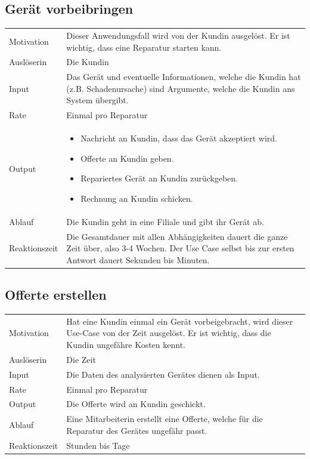 \documentclass[a4paper]{scrartcl}
\begin{document}
\subsection{Gerät vorbeibringen}
\begin{tabularx}{\textwidth}{l|X}
  
  Motivation & Dieser Anwendungsfall wird von
  der Kundin ausgelöst. Er ist wichtig, dass eine
  Reparatur starten kann. \\ 
  Auslöserin & Die Kundin \\ 
  Input & Das Gerät und eventuelle Informationen, welche
  die Kundin hat (z.B. Schadenursache) sind Argumente, welche
  die Kundin ans System übergibt. \\ 
  Rate & Einmal pro Reparatur \\ 
  Output &
  \begin{minipage}[t]{\linewidth}
  \begin{itemize}[nosep,after=\strut]
    \item Nachricht an Kundin, dass das Gerät akzeptiert wird.
    \item Offerte an Kundin geben.
    \item Repariertes Gerät an Kundin zurückgeben.
    \item Rechnung an Kundin schicken.
  \end{itemize}
  \end{minipage} \\
  Ablauf & Die Kundin geht in eine Filiale und
  gibt ihr Gerät ab. \\ 
  Reaktionszeit & Die Gesamtdauer mit allen Abhängigkeiten
  dauert die ganze Zeit über, also 3-4 Wochen. Der Use Case selbst
  bis zur ersten Antwort dauert Sekunden bis Minuten. \\
\end{tabularx}

\subsection{Offerte erstellen}
\begin{tabularx}{\textwidth}{l|X}
  Motivation & Hat eine Kundin einmal ein Gerät
  vorbeigebracht, wird dieser Use-Case von der Zeit
  ausgelöst. Er ist wichtig, dass die Kundin ungefähre
  Kosten kennt. \\ 
  Auslöserin & Die Zeit \\ 
  Input & Die Daten des analysierten Gerätes dienen
  als Input. \\ 
  Rate & Einmal pro Reparatur \\ 
  Output & Die Offerte wird an Kundin geschickt. \\
  Ablauf & Eine Mitarbeiterin erstellt eine Offerte,
  welche für die Reparatur des Gerätes ungefähr passt. \\
  Reaktionszeit & Stunden bis Tage \\
\end{tabularx}
\end{document}
